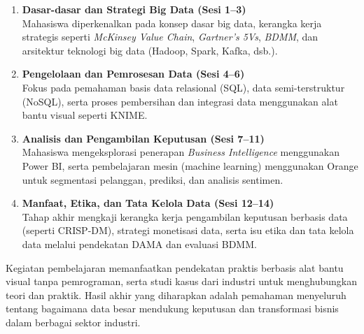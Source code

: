 \begin{enumerate}
	\item \textbf{Dasar-dasar dan Strategi Big Data (Sesi 1--3)} \\
	Mahasiswa diperkenalkan pada konsep dasar big data, kerangka kerja strategis seperti \textit{McKinsey Value Chain}, \textit{Gartner’s 5Vs}, \textit{BDMM}, dan arsitektur teknologi big data (Hadoop, Spark, Kafka, dsb.).
	
	\item \textbf{Pengelolaan dan Pemrosesan Data (Sesi 4--6)} \\
	Fokus pada pemahaman basis data relasional (SQL), data semi-terstruktur (NoSQL), serta proses pembersihan dan integrasi data menggunakan alat bantu visual seperti KNIME.
	
	\item \textbf{Analisis dan Pengambilan Keputusan (Sesi 7--11)} \\
	Mahasiswa mengeksplorasi penerapan \textit{Business Intelligence} menggunakan Power BI, serta pembelajaran mesin (machine learning) menggunakan Orange untuk segmentasi pelanggan, prediksi, dan analisis sentimen.
	
	\item \textbf{Manfaat, Etika, dan Tata Kelola Data (Sesi 12--14)} \\
	Tahap akhir mengkaji kerangka kerja pengambilan keputusan berbasis data (seperti CRISP-DM), strategi monetisasi data, serta isu etika dan tata kelola data melalui pendekatan DAMA dan evaluasi BDMM.
\end{enumerate}

Kegiatan pembelajaran memanfaatkan pendekatan praktis berbasis alat bantu visual tanpa pemrograman, serta studi kasus dari industri untuk menghubungkan teori dan praktik. Hasil akhir yang diharapkan adalah pemahaman menyeluruh tentang bagaimana data besar mendukung keputusan dan transformasi bisnis dalam berbagai sektor industri.
